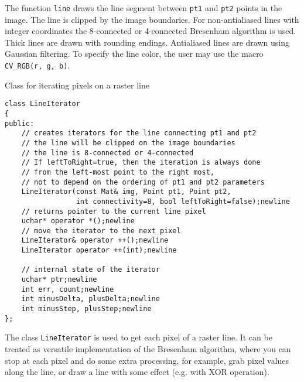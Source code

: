 \begin{description}
\end{description}

The function \texttt{line} draws the line segment between
\texttt{pt1} and \texttt{pt2} points in the image. The line is
clipped by the image boundaries. For non-antialiased lines
with integer coordinates the 8-connected or 4-connected Bresenham
algorithm is used. Thick lines are drawn with rounding endings.
Antialiased lines are drawn using Gaussian filtering. To specify
the line color, the user may use the macro
\texttt{CV\_RGB(r, g, b)}.


Class for iterating pixels on a raster line

\begin{lstlisting}
class LineIterator
{
public:
    // creates iterators for the line connecting pt1 and pt2
    // the line will be clipped on the image boundaries
    // the line is 8-connected or 4-connected
    // If leftToRight=true, then the iteration is always done
    // from the left-most point to the right most,
    // not to depend on the ordering of pt1 and pt2 parameters
    LineIterator(const Mat& img, Point pt1, Point pt2,
                 int connectivity=8, bool leftToRight=false);newline
    // returns pointer to the current line pixel
    uchar* operator *();newline
    // move the iterator to the next pixel
    LineIterator& operator ++();newline
    LineIterator operator ++(int);newline

    // internal state of the iterator
    uchar* ptr;newline
    int err, count;newline
    int minusDelta, plusDelta;newline
    int minusStep, plusStep;newline
};
\end{lstlisting}

The class \texttt{LineIterator} is used to get each pixel of a raster line. It can be treated as versatile implementation of the Bresenham algorithm, where you can stop at each pixel and do some extra processing, for example, grab pixel values along the line, or draw a line with some effect (e.g. with XOR operation).

